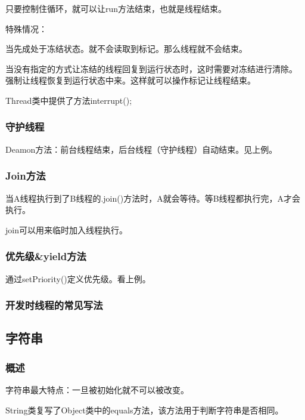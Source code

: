 \documentclass[UTF8]{ctexart}
\begin{document}
只要控制住循环，就可以让run方法结束，也就是线程结束。

特殊情况：

当先成处于冻结状态。就不会读取到标记。那么线程就不会结束。

当没有指定的方式让冻结的线程回复到运行状态时，这时需要对冻结进行清除。
强制让线程恢复到运行状态中来。这样就可以操作标记让线程结束。

Thread类中提供了方法interrupt();



\subsubsection{守护线程}

Deamon方法：前台线程结束，后台线程（守护线程）自动结束。见上例。

\subsubsection{Join方法}

当A线程执行到了B线程的.join()方法时，A就会等待。等B线程都执行完，A才会执行。

join可以用来临时加入线程执行。



\subsubsection{优先级\&yield方法}

通过setPriority()定义优先级。看上例。

\subsubsection{开发时线程的常见写法}



\subsection{字符串}
\subsubsection{概述}
\textbullet 字符串最大特点：一旦被初始化就不可以被改变。

\textbullet String类复写了Object类中的equals方法，该方法用于判断字符串是否相同。
\end{document}
